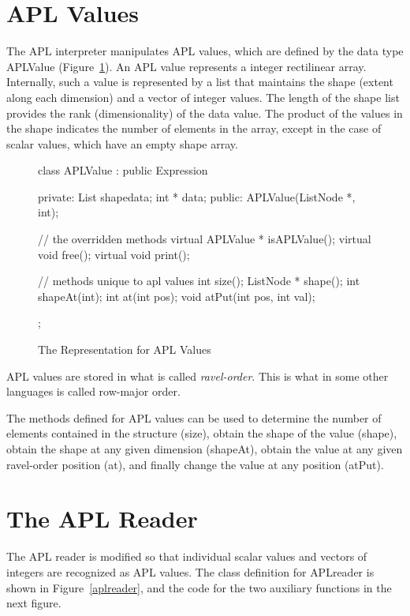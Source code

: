 \section{APL Values}

The APL interpreter manipulates APL values, which are defined by the data
type {\sf APLValue} (Figure~\ref{aplvalue}).  An APL value represents a
integer rectilinear array.  Internally, such a value is represented by a
list that maintains the shape (extent along each dimension) and a vector of
integer values.  The length of the shape list provides the rank
(dimensionality) of the data value.  The product of the values in the shape
indicates the number of elements in the array, except in the case of scalar
values, which have an empty shape array.

\begin{figure}
\begin{cprog}
class APLValue : public Expression {
private:
	List shapedata;
	int * data;
public:
	APLValue(ListNode *, int);

	// the overridden methods
	virtual APLValue * isAPLValue();
	virtual void free();
	virtual void print();

	// methods unique to apl values
	int size();
	ListNode * shape();
	int shapeAt(int);
	int at(int pos);
	void atPut(int pos, int val);
};
\end{cprog}
\caption{The Representation for APL Values}\label{aplvalue}
\end{figure}

APL values are stored in what is called {\em ravel-order}.  This is what in
some other languages is called row-major order.

The methods defined for APL values can be used to determine the number of
elements contained in the structure ({\sf size}), obtain the shape of the
value ({\sf shape}), obtain the shape at any given dimension 
({\sf shapeAt}), obtain the value at any given ravel-order position 
({\sf at}), and finally change the value at any position ({\sf atPut}).

\section{The APL Reader}

The APL reader is modified so that individual scalar values and vectors of
integers are recognized as APL values.
The class definition for {\sf APLreader} is shown in
Figure~\ref{aplreader}, and the code for the two auxiliary functions in the
next figure.

